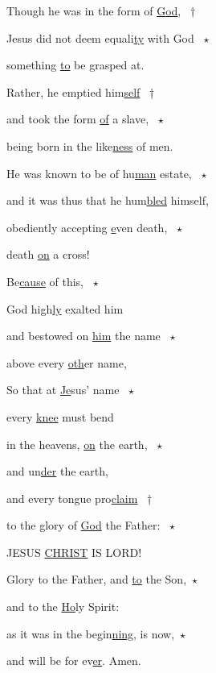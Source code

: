 \noindent Though he was in the form of \uline{God}, ~†~\nopagebreak

Jesus did not deem equali\uline{ty} with God ~$\star$~\nopagebreak

something \uline{to} be grasped at.

\noindent Rather, he emptied him\uline{self} ~†~\nopagebreak

and took the form \uline{of} a slave, ~$\star$~\nopagebreak

being born in the like\uline{ness} of men.

\noindent He was known to be of hu\uline{man} estate, ~$\star$~\nopagebreak

and it was thus that he hum\uline{bled} himself,

\noindent obediently accepting \uline{e}ven death, ~$\star$~\nopagebreak

death \uline{on} a cross!

\noindent Be\uline{cause} of this, ~$\star$~\nopagebreak

God high\uline{ly} exalted him


\noindent and bestowed on \uline{him} the name ~$\star$~\nopagebreak

above every \uline{oth}er name,

\noindent So that at \uline{Je}sus’ name ~$\star$~\nopagebreak

every \uline{knee} must bend

\noindent in the heavens, \uline{on} the earth, ~$\star$~\nopagebreak

and un\uline{der} the earth,

\noindent and every tongue pro\uline{claim} ~†~\nopagebreak

to the glory of \uline{God} the Father: ~$\star$~\nopagebreak

JESUS \uline{CHRIST} IS LORD!

\noindent Glory to the Father, and \uline{to} the Son,~$\star$~\nopagebreak

and to the \uline{Ho}ly Spirit:

\noindent as it was in the begin\uline{ning}, is now,~$\star$~\nopagebreak

and will be for ev\uline{er}. Amen.

